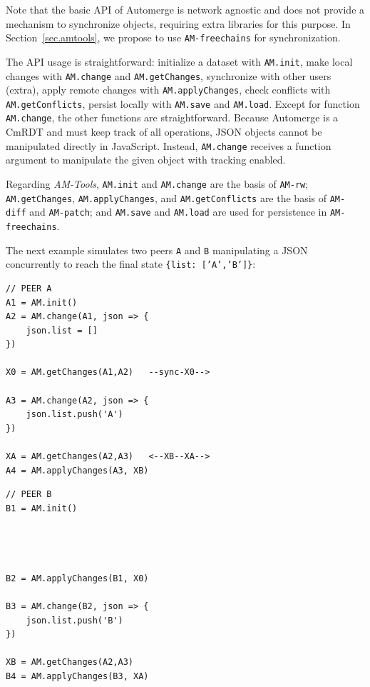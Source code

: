 \documentclass[12pt]{article}
\newcommand{\AMT}      {\emph{AM-Tools}\xspace}
\newcommand{\code}[1]  {\texttt{\footnotesize{#1}}}
\begin{document}
Note that the basic API of Automerge is network agnostic and does not provide
a mechanism to synchronize objects, requiring extra libraries for this purpose.
In Section~\ref{sec.amtools}, we propose to use \code{AM-freechains} for
synchronization.

The API usage is straightforward:
    initialize a dataset with \code{AM.init},
    make local changes with \code{AM.change} and \code{AM.getChanges},
    synchronize with other users (extra),
    apply remote changes with \code{AM.applyChanges},
    check conflicts with \code{AM.getConflicts},
    persist locally with \code{AM.save} and \code{AM.load}.
Except for function \code{AM.change}, the other functions are straightforward.
%
Because Automerge is a CmRDT and must keep track of all operations, JSON
objects cannot be manipulated directly in JavaScript.
Instead, \code{AM.change} receives a function argument to manipulate
the given object with tracking enabled.

Regarding \AMT,
    \code{AM.init} and \code{AM.change} are the basis of \code{AM-rw};
    \code{AM.getChanges}, \code{AM.applyChanges}, and \code{AM.getConflicts}
    are the basis of \code{AM-diff} and \code{AM-patch}; and
    \code{AM.save} and \code{AM.load} are used for persistence in
    \code{AM-freechains}.

The next example simulates two peers \code{A} and \code{B} manipulating a
JSON concurrently to reach the final state \code{\{list:~['A','B']\}}:

\noindent
{\footnotesize
\begin{minipage}[t]{0.6\textwidth}
\begin{verbatim}
// PEER A
A1 = AM.init()
A2 = AM.change(A1, json => {
    json.list = []
})

X0 = AM.getChanges(A1,A2)   --sync-X0-->

A3 = AM.change(A2, json => {
    json.list.push('A')
})

XA = AM.getChanges(A2,A3)   <--XB--XA-->
A4 = AM.applyChanges(A3, XB)
\end{verbatim}
\end{minipage}
\begin{minipage}[t]{0.4\textwidth}
\begin{verbatim}
// PEER B
B1 = AM.init()




B2 = AM.applyChanges(B1, X0)

B3 = AM.change(B2, json => {
    json.list.push('B')
})

XB = AM.getChanges(A2,A3)
B4 = AM.applyChanges(B3, XA)
\end{verbatim}
\end{minipage}
}
\end{document}
